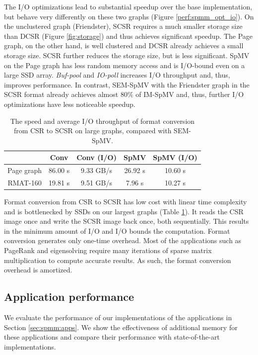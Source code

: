 The I/O optimizations lead to substantial speedup over the base implementation,
but behave very differently on these two graphs (Figure \ref{perf:spmm_opt_io}).
On the unclustered graph (Friendster), SCSR requires a much smaller storage size
than DCSR (Figure \ref{fig:storage}) and thus achieves significant
speedup. The Page graph, on the other hand, is well clustered and DCSR already
achieves a small storage size. SCSR further reduces the storage size, but is
less significant. SpMV on the Page graph has less random memory access and is
I/O-bound even on a large SSD array. \textit{Buf-pool} and \textit{IO-poll}
increases I/O throughput and, thus, improves performance. In contrast, SEM-SpMV
with the Friendster graph in the SCSR format already achieves almost 80\% of
IM-SpMV and, thus, further I/O optimizations have less noticeable speedup.

\begin{table}
\begin{center}
\footnotesize
\begin{tabular}{|c|c|c|c|c|}
\hline
	& Conv & Conv (I/O) & SpMV & SpMV (I/O) \\
\hline
Page graph & 86.00 s & 9.33 GB/s & 26.92 s & 10.60 s\\
\hline
RMAT-160 & 19.81 s & 9.51 GB/s & 7.96 s & 10.27 s\\
\hline
\end{tabular}
\normalsize
\end{center}
\caption{The speed and average I/O throughput of format conversion from CSR
	to SCSR on large graphs, compared with SEM-SpMV.}
\label{convert}
\end{table}

Format conversion from CSR to SCSR has low cost with linear time complexity and
is bottlenecked by SSDs on our largest graphs (Table \ref{convert}).
It reads the CSR image once and write the SCSR image back once, both sequentially.
This results in the minimum amount of I/O and I/O bounds the computation.
Format conversion generates only one-time overhead. Most of the applications
such as PageRank and eigensolving require many iterations of sparse matrix
multiplication to compute accurate results. As such, the format conversion
overhead is amortized.

\subsection{Application performance}

We evaluate the performance of our implementations of the applications in
Section \ref{sec:spmm:apps}. We show the effectiveness of additional memory for
these applications and compare their performance with state-of-the-art
implementations.

